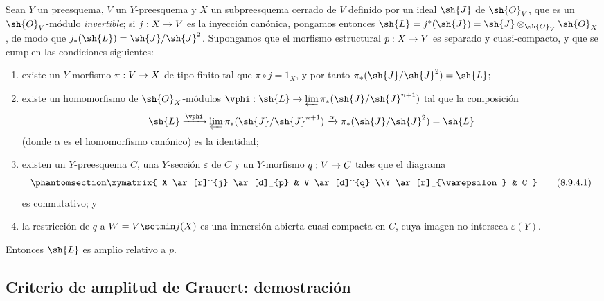 \documentclass[oneside,10pt]{amsart}
\makeatletter
\newcommand{\ega@arrow}[2]{\mathchoice{#1}{#2}{#2}{#2}}
\renewcommand{\to}{\ega@arrow{\longrightarrow}{\rightarrow}}
\newcommand{\oldpage}[2][]{\marginnote{\normalfont\footnotesize\textbf{#1}~|~#2}\ignorespaces}
\let\EGAOriginalLabel\label
\renewcommand{\label}[1]{\phantomsection\EGAOriginalLabel{#1}}
\makeatother
\begin{document}
\begin{proposition}[8.9.4]
\label{II.8.9.4}
Sean $Y$ un preesquema, $V$ un $Y$-preesquema y $X$ un subpreesquema cerrado de $V$ definido por un ideal $\sh{J}$ de $\sh{O}_V$, que es un $\sh{O}_V$-módulo \emph{invertible};
si $j:X\to V$ es
\oldpage[II]{184}
la inyección canónica, pongamos entonces $\sh{L} = j^*(\sh{J}) = \sh{J}\otimes_{\sh{O}_V}\sh{O}_X$, de modo que $j_*(\sh{L})=\sh{J}/\sh{J}^2$.
Supongamos que el morfismo estructural $p:X\to Y$ es separado y cuasi-compacto, y que se cumplen las condiciones siguientes:
\begin{enumerate}
  \item[\rm{(i)}] existe un $Y$-morfismo $\pi:V\to X$ de tipo finito tal que $\pi\circ j=1_X$, y por tanto $\pi_*(\sh{J}/\sh{J}^2)=\sh{L}$;
  \item[\rm{(ii)}] existe un homomorfismo de $\sh{O}_X$-módulos $\vphi:\sh{L}\to\varprojlim\pi_*(\sh{J}/\sh{J}^{n+1})$ tal que la composición
    \[
      \sh{L}
      \xrightarrow{\vphi}
      \varprojlim \pi_*(\sh{J}/\sh{J}^{n+1})
      \xrightarrow{\alpha}
      \pi_*(\sh{J}/\sh{J}^2) = \sh{L}
    \]
    (donde $\alpha$ es el homomorfismo canónico) es la identidad;
  \item[\rm{(iii)}] existen un $Y$-preesquema $C$, una $Y$-sección $\varepsilon$ de $C$ y un $Y$-morfismo $q:V\to C$ tales que el diagrama
    \[
    \label{II.8.9.4.1}
      \xymatrix{
        X
          \ar[r]^{j}
          \ar[d]_{p}
      & V
          \ar[d]^{q}
      \\Y
          \ar[r]_{\varepsilon}
      & C
      }
    \tag{8.9.4.1}
    \]
    es conmutativo; y
  \item[\rm{(iv)}] la restricción de $q$ a $W=V\setmin j(X)$ es una inmersión abierta cuasi-compacta en $C$, cuya imagen no interseca $\varepsilon(Y)$.
\end{enumerate}
Entonces $\sh{L}$ es amplio relativo a $p$.
\end{proposition}


\subsection{Criterio de amplitud de Grauert: demostración}
\label{subsection:II.8.10}
\end{document}
